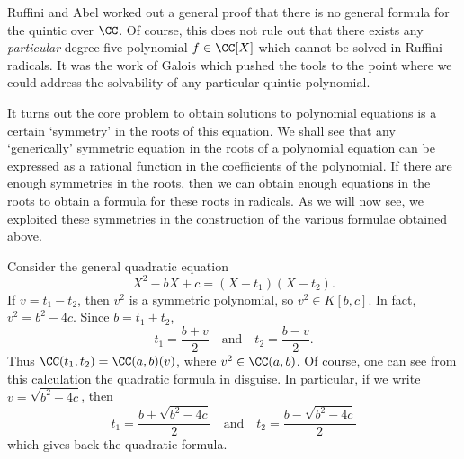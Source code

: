 \begin{remark}
	Ruffini and Abel worked out a general proof that there is no general formula for the quintic over $\CC$. Of course, this does not rule out that there exists any \emph{particular} degree five polynomial $f \in \CC[X]$ which cannot be solved in Ruffini radicals. It was the work of Galois which pushed the tools to the point where we could address the solvability of any particular quintic polynomial.
\end{remark}

It turns out the core problem to obtain solutions to polynomial equations is a certain `symmetry' in the roots of this equation. We shall see that any `generically' symmetric equation in the roots of a polynomial equation can be expressed as a rational function in the coefficients of the polynomial. If there are enough symmetries in the roots, then we can obtain enough equations in the roots to obtain a formula for these roots in radicals. As we will now see, we exploited these symmetries in the construction of the various formulae obtained above.

\begin{example}
	Consider the general quadratic equation
	\[ X^2 - b X + c = (X - t_1)(X - t_2). \]
	If $v = t_1 - t_2$, then $v^2$ is a symmetric polynomial, so $v^2 \in K[b,c]$. In fact, $v^2 = b^2 - 4c$. Since $b = t_1 + t_2$,
	\[ t_1 = \frac{b + v}{2} \quad\text{and}\quad t_2 = \frac{b - v}{2}. \]
	Thus $\CC(t_1,t_2) = \CC(a,b)(v)$, where $v^2 \in \CC(a,b)$. Of course, one can see from this calculation the quadratic formula in disguise. In particular, if we write $v = \sqrt{b^2 - 4c}$, then
	\[ t_1 = \frac{b + \sqrt{b^2 - 4c}}{2} \quad\text{and}\quad t_2 = \frac{b - \sqrt{b^2 - 4c}}{2} \]
	which gives back the quadratic formula.
\end{example}

